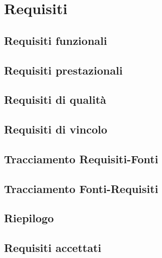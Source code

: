 %


\section{Requisiti}

\subsection{Requisiti funzionali}


\subsection{Requisiti prestazionali}

\subsection{Requisiti di qualità}

\subsection{Requisiti di vincolo}

\subsection{Tracciamento Requisiti-Fonti}

\subsection{Tracciamento Fonti-Requisiti}

\subsection{Riepilogo}

\subsection{Requisiti accettati}

